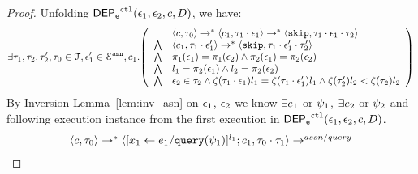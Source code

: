 \begin{proof}

Unfolding $\mathsf{DEP_{\mathtt{e}}}^{\mathtt{{ctl}}}(\mathtt{\epsilon}_1, \mathtt{\epsilon}_2, c, D)$, we have:
%
\[
\exists \vtrace_1, \vtrace_2, \vtrace_2', \vtrace_0 \in \mathcal{T}, 
\event_1' \in \eventset^{\asn}, {c}_1.
\left(
\begin{array}{ll}   
  & \config{{c}, \vtrace_0} \rightarrow^{*} 
    \config{{c}_1, \vtrace_1 \cdot \event_1}  \rightarrow^{*} 
    \config{\eskip,  \vtrace_1 \cdot \event_1 \cdot \vtrace_2} 
  \\ 
  \bigwedge &
  \config{{c}_1, \vtrace_1 \cdot \event_1'}  \rightarrow^{*} 
  \config{\eskip,  \vtrace_1 \cdot \event_1' \cdot \vtrace_2' } 
  \\
  \bigwedge &  \pi_1(\event_1) = \pi_1(\event_2) \land \pi_2(\event_1) = \pi_2(\event_2) \\
  \bigwedge & l_1 = \pi_2(\event_1) \land l_2 = \pi_2(\event_2)
  \\
  \bigwedge & \event_2 \in \trace_2 \land \vcounter(\vtrace_1 \cdot \event_1) l_1 = \vcounter(\vtrace_1 \cdot \event_1')l_1  \land \vcounter(\vtrace_2') l_2 < \vcounter(\trace_2) l_2 
\end{array}
\right)
 \]%
By Inversion Lemma~\ref{lem:inv_asn} on 
 $\mathtt{\epsilon}_1$, $\mathtt{\epsilon}_2$ we know $\exists e_1$ or $\psi_1$, $\exists e_2$ or $\psi_2$ and following execution instance
  from the first execution in $\mathsf{DEP_{\mathtt{e}}}^{\mathtt{{ctl}}}(\mathtt{\epsilon}_1, \mathtt{\epsilon}_2, c, D)$.
\begin{equation}
  \begin{array}{l}   
\langle {c}, \mathtt{\tau}_0 \rangle \rightarrow^{*} 
\langle [\mathrel{ {x}_1 \leftarrow e_1 / {\tt query}(\psi_1) }]^{l_1} ; {c}_1, \mathtt{\tau}_0 \cdot \mathtt{\tau}_1 \rangle  
\rightarrow^{assn/query}

\end{array}
\end{equation}
\end{proof}
